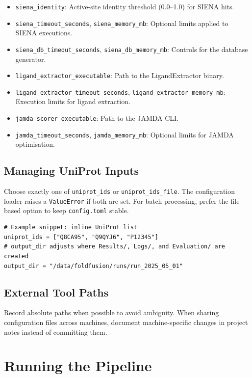 \documentclass[11pt]{article}
\begin{document}
\begin{itemize}[noitemsep,leftmargin=*,labelsep=0.5em]
            collected per UniProt ID.
      \item \texttt{siena\_identity}: Active-site identity threshold (0.0--1.0)
            for SIENA hits.
      \item \texttt{siena\_timeout\_seconds}, \texttt{siena\_memory\_mb}:
            Optional limits applied to SIENA executions.
      \item \texttt{siena\_db\_timeout\_seconds}, \texttt{siena\_db\_memory\_mb}:
            Controls for the database generator.
      \item \texttt{ligand\_extractor\_executable}: Path to the
            LigandExtractor binary.
      \item \texttt{ligand\_extractor\_timeout\_seconds},
            \texttt{ligand\_extractor\_memory\_mb}: Execution limits for ligand
            extraction.
      \item \texttt{jamda\_scorer\_executable}: Path to the JAMDA CLI.
      \item \texttt{jamda\_timeout\_seconds}, \texttt{jamda\_memory\_mb}:
            Optional limits for JAMDA optimisation.
\end{itemize}

\subsection{Managing UniProt Inputs}
Choose exactly one of \texttt{uniprot\_ids} or \texttt{uniprot\_ids\_file}. The
configuration loader raises a \texttt{ValueError} if both are set. For batch
processing, prefer the file-based option to keep \texttt{config.toml} stable.

\begin{lstlisting}[style=commandline]
# Example snippet: inline UniProt list
uniprot_ids = ["Q8CA95", "Q9QYJ6", "P12345"]
# output_dir adjusts where Results/, Logs/, and Evaluation/ are created
output_dir = "/data/foldfusion/runs/run_2025_05_01"
\end{lstlisting}

\subsection{External Tool Paths}
Record absolute paths when possible to avoid ambiguity. When sharing
configuration files across machines, document machine-specific changes in
project notes instead of committing them.

\section{Running the Pipeline}
\end{document}

